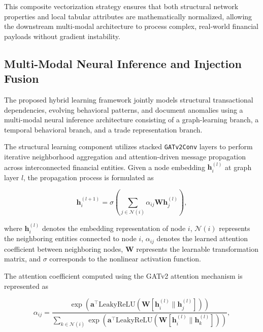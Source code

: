 \documentclass[conference]{IEEEtran}
\begin{document}
This composite vectorization strategy ensures that both structural network properties and local tabular attributes are mathematically normalized, allowing the downstream multi-modal architecture to process complex, real-world financial payloads without gradient instability.

\subsection{\textbf{Multi-Modal Neural Inference and Injection Fusion}}

The proposed hybrid learning framework jointly models structural transactional dependencies, evolving behavioral patterns, and document anomalies using a multi-modal neural inference architecture consisting of a graph-learning branch, a temporal behavioral branch, and a trade representation branch.

The structural learning component utilizes stacked \texttt{GATv2Conv} layers to perform iterative neighborhood aggregation and attention-driven message propagation across interconnected financial entities. Given a node embedding \(\mathbf{h}_i^{(l)}\) at graph layer \(l\), the propagation process is formulated as

\begin{equation}
\mathbf{h}_i^{(l+1)} =
\sigma
\left(
\sum_{j \in \mathcal{N}(i)}
\alpha_{ij}
\mathbf{W}\mathbf{h}_j^{(l)}
\right),
\label{eq:gat}
\end{equation}

where \(\mathbf{h}_i^{(l)}\) denotes the embedding representation of node \(i\), \(\mathcal{N}(i)\) represents the neighboring entities connected to node \(i\), \(\alpha_{ij}\) denotes the learned attention coefficient between neighboring nodes, \(\mathbf{W}\) represents the learnable transformation matrix, and \(\sigma\) corresponds to the nonlinear activation function.

The attention coefficient computed using the GATv2 attention mechanism is represented as

\begin{equation}
\alpha_{ij} =
\frac{
\exp
\left(
\mathbf{a}^{\top}
\text{LeakyReLU}
\left(
\mathbf{W}
[
\mathbf{h}_i^{(l)}
\parallel
\mathbf{h}_j^{(l)}
]
\right)
\right)
}
{
\sum_{k \in \mathcal{N}(i)}
\exp
\left(
\mathbf{a}^{\top}
\text{LeakyReLU}
\left(
\mathbf{W}
[
\mathbf{h}_i^{(l)}
\parallel
\mathbf{h}_k^{(l)}
]
\right)
\right)
},
\label{eq:gat_attention}
\end{equation}
\end{document}
